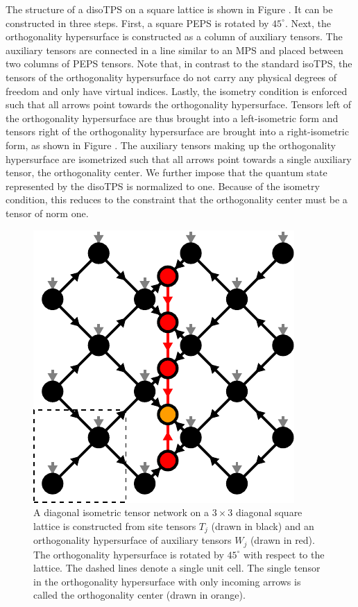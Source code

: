 The structure of a disoTPS on a square lattice is shown in Figure . It can be constructed in three steps. First, a square PEPS is rotated by $45^\circ$. Next, the orthogonality hypersurface is constructed as a column of auxiliary tensors. The auxiliary tensors are connected in a line similar to an MPS and placed between two columns of PEPS tensors. Note that, in contrast to the standard isoTPS, the tensors of the orthogonality hypersurface do not carry any physical degrees of freedom and only have virtual indices. Lastly, the isometry condition is enforced such that all arrows point towards the orthogonality hypersurface. Tensors left of the orthogonality hypersurface are thus brought into a left-isometric form and tensors right of the orthogonality hypersurface are brought into a right-isometric form, as shown in Figure . The auxiliary tensors making up the orthogonality hypersurface are isometrized such that all arrows point towards a single auxiliary tensor, the orthogonality center. We further impose that the quantum state represented by the disoTPS is normalized to one. Because of the isometry condition, this reduces to the constraint that the orthogonality center must be a tensor of norm one.\par
\begin{figure}[ht]
	\centering
	\includegraphics[scale=1]{figures/tikz/disoTPS/disoTPS_structure/disoTPS_structure.pdf}
	\caption{A diagonal isometric tensor network on a $3\times3$ diagonal square lattice is constructed from site tensors $T_j$ (drawn in black) and an orthogonality hypersurface of auxiliary tensors $W_j$ (drawn in red). The orthogonality hypersurface is rotated by $45^\circ$ with respect to the lattice. The dashed lines denote a single unit cell. The single tensor in the orthogonality hypersurface with only incoming arrows is called the orthogonality center (drawn in orange).}
	\label{fig:disoTPS_structure}
\end{figure}
